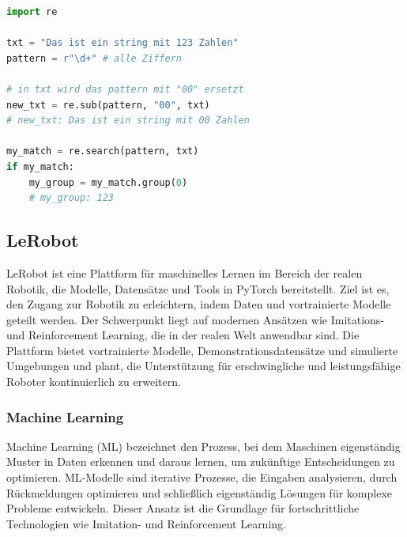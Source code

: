 \documentclass[a4paper, 12pt]{article}
\begin{document}
\begin{lstlisting}[language=Python, caption=Beispiel für regex Syntax:]
import re

txt = "Das ist ein string mit 123 Zahlen"
pattern = r"\d+" # alle Ziffern

# in txt wird das pattern mit "00" ersetzt
new_txt = re.sub(pattern, "00", txt)
# new_txt: Das ist ein string mit 00 Zahlen

my_match = re.search(pattern, txt)
if my_match:
	my_group = my_match.group(0)
	# my_group: 123
\end{lstlisting} %

\subsection{LeRobot} \label{lerobot}
LeRobot ist eine Plattform für maschinelles Lernen im Bereich der realen Robotik, die Modelle, Datensätze und Tools in PyTorch bereitstellt. Ziel ist es, den Zugang zur Robotik zu erleichtern, indem Daten und vortrainierte Modelle geteilt werden. Der Schwerpunkt liegt auf modernen Ansätzen wie Imitations- und Reinforcement Learning, die in der realen Welt anwendbar sind. Die Plattform bietet vortrainierte Modelle, Demonstrationsdatensätze und simulierte Umgebungen und plant, die Unterstützung für erschwingliche und leistungsfähige Roboter kontinuierlich zu erweitern. \cite{cadene2024lerobot}

\subsubsection{Machine Learning} \label{machine_learning}
Machine Learning (ML) bezeichnet den Prozess, bei dem Maschinen eigenständig Muster in Daten erkennen und daraus lernen, um zukünftige Entscheidungen zu optimieren. ML-Modelle sind iterative Prozesse, die Eingaben analysieren, durch Rückmeldungen optimieren und schließlich eigenständig Lösungen für komplexe Probleme entwickeln. Dieser Ansatz ist die Grundlage für fortschrittliche Technologien wie Imitation- und Reinforcement Learning. \cite{grundlagen_sw_entwicklung} 
\end{document}
